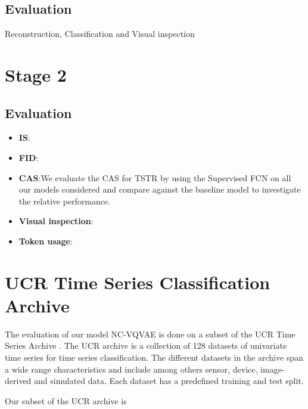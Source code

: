 \documentclass[../../thesis.tex]{subfiles}
\begin{document}
\subsection{Evaluation}
Reconstruction, Classification and Visual inspection



\section{Stage 2}


\subsection{Evaluation}

\begin{itemize}
    \item \textbf{IS}:
    \item \textbf{FID}:
    \item \textbf{CAS}:We evaluate the CAS for TSTR by using the Supervised FCN on all our models considered and compare against the baseline model to investigate the relative performance. 
    \item \textbf{Visual inspection}:
    \item \textbf{Token usage}:
\end{itemize}


\section{UCR Time Series Classification Archive}
The evaluation of our model NC-VQVAE is done on a subset of the UCR Time Series Archive \cite{UCRArchive2018}. The UCR archive is a collection of 128 datasets of univariate time series for time series classification. The different datasets in the archive span a wide range characteristics and include among others sensor, device, image-derived and simulated data. Each dataset has a predefined training and test split.\newline

Our subset of the UCR archive is
\end{document}
